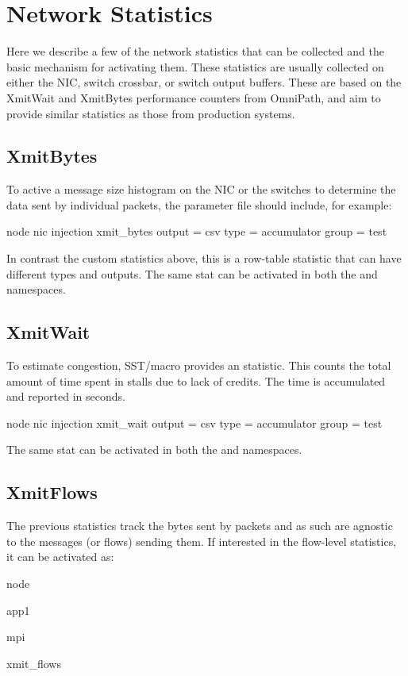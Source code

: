 

\section{Network Statistics}
\label{sec:tutorials:packetStats}

Here we describe a few of the network statistics that can be collected and the basic mechanism for activating them.
These statistics are usually collected on either the NIC, switch crossbar, or switch output buffers.
These are based on the XmitWait and XmitBytes performance counters from OmniPath,
and aim to provide similar statistics as those from production systems.

\subsection{XmitBytes}
\label{subsec:xmitbytes}
To active a message size histogram on the NIC or the switches to determine the data sent by individual packets, the parameter file should include, for example:

\begin{ViFile}
node {
 nic {
  injection {
   xmit_bytes {
     output = csv
     type = accumulator
     group = test
   }
  }
 } 
}
\end{ViFile}
In contrast the custom statistics above, this is a row-table statistic that can have different types and outputs.
The same stat can be activated in both the  and  namespaces.

\subsection{XmitWait}
\label{subsec:xmitwait}
To estimate congestion, SST/macro provides an  statistic.
This counts the total amount of time spent in stalls due to lack of credits.
The time is accumulated and reported in seconds.

\begin{ViFile}
node {
 nic {
  injection {
   xmit_wait {
     output = csv
     type = accumulator
     group = test
   }
  }
 }
}
\end{ViFile}
The same stat can be activated in both the  and  namespaces.

\subsection{XmitFlows}
\label{subsec:xmitflows}
The previous statistics track the bytes sent by packets and as such are agnostic to the messages (or flows) sending them.
If interested in the flow-level statistics, it can be activated as:

\begin{ViFile}
node {
 app1 {
  mpi {
    xmit_flows {

    }
  }
 }
}
\end{ViFile}


